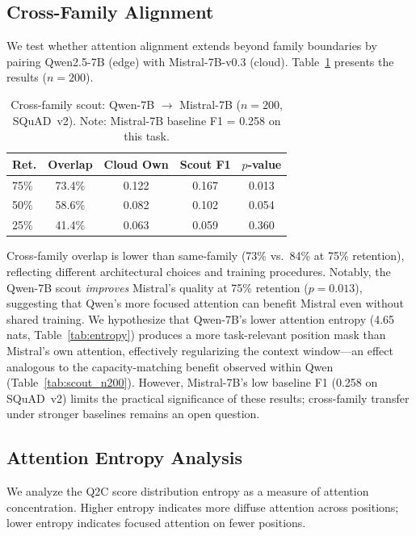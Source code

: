 \documentclass[journal]{IEEEtran}
\newcommand{\QtoC}{\textsc{Q2C}\xspace}
\begin{document}
\subsection{Cross-Family Alignment}

We test whether attention alignment extends beyond family boundaries by pairing Qwen2.5-7B (edge) with Mistral-7B-v0.3 (cloud).
Table~\ref{tab:cross_family} presents the results ($n = 200$).

\begin{table}[t]
\centering
\caption{Cross-family scout: Qwen-7B $\to$ Mistral-7B ($n = 200$, SQuAD~v2). Note: Mistral-7B baseline F1 = 0.258 on this task.}
\label{tab:cross_family}
\small
\begin{tabular}{@{}lcccc@{}}
\toprule
\textbf{Ret.} & \textbf{Overlap} & \textbf{Cloud Own} & \textbf{Scout F1} & \textbf{$p$-value} \\
\midrule
75\% & 73.4\% & 0.122 & 0.167 & 0.013 \\
50\% & 58.6\% & 0.082 & 0.102 & 0.054 \\
25\% & 41.4\% & 0.063 & 0.059 & 0.360 \\
\bottomrule
\end{tabular}
\end{table}

Cross-family overlap is lower than same-family (73\% vs.\ 84\% at 75\% retention), reflecting different architectural choices and training procedures.
Notably, the Qwen-7B scout \emph{improves} Mistral's quality at 75\% retention ($p = 0.013$), suggesting that Qwen's more focused attention can benefit Mistral even without shared training.
We hypothesize that Qwen-7B's lower attention entropy (4.65 nats, Table~\ref{tab:entropy}) produces a more task-relevant position mask than Mistral's own attention, effectively regularizing the context window---an effect analogous to the capacity-matching benefit observed within Qwen (Table~\ref{tab:scout_n200}).
However, Mistral-7B's low baseline F1 (0.258 on SQuAD~v2) limits the practical significance of these results; cross-family transfer under stronger baselines remains an open question.

\subsection{Attention Entropy Analysis}

We analyze the \QtoC score distribution entropy as a measure of attention concentration.
Higher entropy indicates more diffuse attention across positions; lower entropy indicates focused attention on fewer positions.
\end{document}
